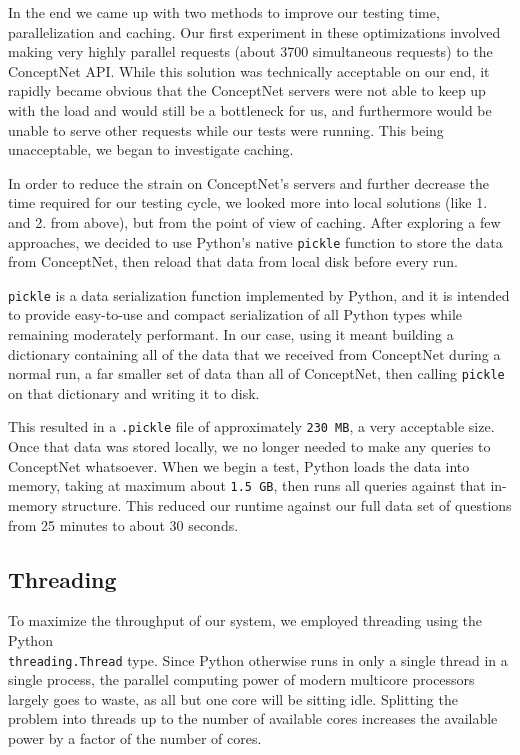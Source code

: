\documentclass[11pt]{article}
\begin{document}
In the end we came up with two methods to improve our testing time, parallelization and caching. Our first experiment in these optimizations involved making very highly parallel requests (about 3700 simultaneous requests) to the ConceptNet API. While this solution was technically acceptable on our end, it rapidly became obvious that the ConceptNet servers were not able to keep up with the load and would still be a bottleneck for us, and furthermore would be unable to serve other requests while our tests were running. This being unacceptable, we began to investigate caching.

In order to reduce the strain on ConceptNet's servers and further decrease the time required for our testing cycle, we looked more into local solutions (like 1. and 2. from above), but from the point of view of caching. After exploring a few approaches, we decided to use Python's native \verb|pickle| function to store the data from ConceptNet, then reload that data from local disk before every run.

\verb|pickle| is a data serialization function implemented by Python, and it is intended to provide easy-to-use and compact serialization of all Python types while remaining moderately performant. In our case, using it meant building a dictionary containing all of the data that we received from ConceptNet during a normal run, a far smaller set of data than all of ConceptNet, then calling \verb|pickle| on that dictionary and writing it to disk.

This resulted in a \verb|.pickle| file of approximately \verb|230 MB|, a very acceptable size. Once that data was stored locally, we no longer needed to make any queries to ConceptNet whatsoever. When we begin a test, Python loads the data into memory, taking at maximum about \verb|1.5 GB|, then runs all queries against that in-memory structure. This reduced our runtime against our full data set of questions from 25 minutes to about 30 seconds.

\subsection{Threading}

To maximize the throughput of our system, we employed threading using the Python\\ \verb|threading.Thread| type. Since Python otherwise runs in only a single thread in a single process, the parallel computing power of modern multicore processors largely goes to waste, as all but one core will be sitting idle. Splitting the problem into threads up to the number of available cores increases the available power by a factor of the number of cores.
\end{document}
